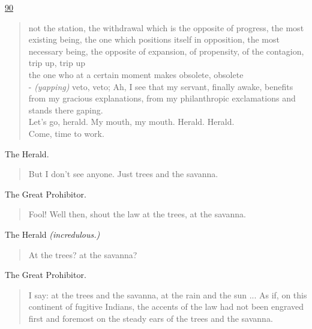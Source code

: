 \documentclass[letterpaper,article,12pt,oneside,notitlepage]{memoir}
\begin{document}
\clearpage

\href{http://cesaire.elotroalex.com/chiens/chiens/p090.html}{90}

\begin{verse}
not the station, the withdrawal which is the opposite of progress, the most existing being, the one which positions itself in opposition, the most necessary being, the opposite of expansion, of propensity, of the contagion, trip up, trip up \\
the one who at a certain moment makes obsolete, obsolete \\
- \textit{(yapping)} veto, veto;
Ah, I see that my servant, finally awake, benefits from my gracious explanations, from my philanthropic exclamations and stands there gaping. \\
Let's go, herald. My mouth, my mouth. Herald. Herald. \\
Come, time to work. \\
\end{verse}

\begin{center}The Herald.\end{center}

\begin{verse}
But I don't see anyone. Just trees and the savanna. \\
\end{verse}

\begin{center}The Great Prohibitor.\end{center}

\begin{verse}
Fool! Well then, shout the law at the trees, at the savanna. \\
\end{verse}

\begin{center}The Herald  \textit{(incredulous.)}\end{center}

\begin{verse}
\hspace{1cm} At the trees? at the savanna? \\
\end{verse}

\begin{center}The Great Prohibitor.\end{center}

\begin{verse}
I say: at the trees and the savanna, at the rain and the sun ... As if, on this continent of fugitive Indians, the accents of the law had not been engraved first and foremost on the steady ears of the trees and the savanna.  \\
\end{verse}
\end{document}

